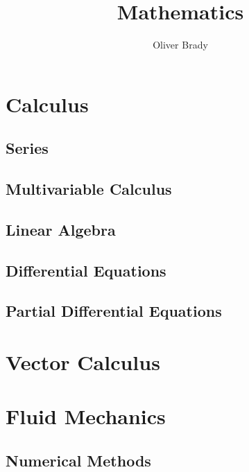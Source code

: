 \documentclass[]{book}
\title{{\Huge Mathematics}}
\author{Oliver Brady}
\begin{document}
\maketitle
\tableofcontents

\chapter{Calculus}

\section{Series}
\section{Multivariable Calculus}
\section{Linear Algebra}
\section{Differential Equations}
\section{Partial Differential Equations}
\chapter{Vector Calculus}

\chapter{Fluid Mechanics}

\section{Numerical Methods}
\end{document}

